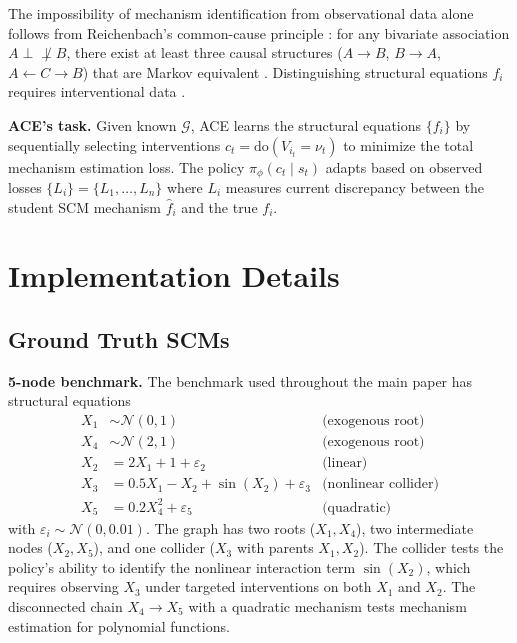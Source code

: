 \documentclass[twoside]{article}
\theoremstyle{plain}
\theoremstyle{definition}
\theoremstyle{remark}
\begin{document}
The impossibility of mechanism identification from observational data alone follows from Reichenbach's common-cause principle \citep{reichenbach1956}: for any bivariate association $A \perp\!\!\!\!\not\perp B$, there exist at least three causal structures ($A \to B$, $B \to A$, $A \leftarrow C \rightarrow B$) that are Markov equivalent \citep{spirtes2000causation,peters2017elements}. Distinguishing structural equations $f_i$ requires interventional data \citep{peters2017elements}.

\textbf{ACE's task.} Given known $\mathcal{G}$, ACE learns the structural equations $\{f_i\}$ by sequentially selecting interventions $c_t = \text{do}(V_{i_t} = \nu_t)$ to minimize the total mechanism estimation loss. The policy $\pi_\phi(c_t \mid s_t)$ adapts based on observed losses $\{L_i\} = \{L_1, \ldots, L_n\}$ where $L_i$ measures current discrepancy between the student SCM mechanism $\hat{f}_i$ and the true $f_i$.

\section{Implementation Details}
\label{app:impl}

\subsection{Ground Truth SCMs}
\label{app:scms}

\textbf{5-node benchmark.} The benchmark used throughout the main paper has structural equations
\begin{align*}
X_1 &\sim \mathcal{N}(0, 1) & \text{(exogenous root)} \\
X_4 &\sim \mathcal{N}(2, 1) & \text{(exogenous root)} \\
X_2 &= 2 X_1 + 1 + \varepsilon_2 & \text{(linear)} \\
X_3 &= 0.5 X_1 - X_2 + \sin(X_2) + \varepsilon_3 & \text{(nonlinear collider)} \\
X_5 &= 0.2 X_4^2 + \varepsilon_5 & \text{(quadratic)}
\end{align*}
with $\varepsilon_i \sim \mathcal{N}(0, 0.01)$. The graph has two roots ($X_1, X_4$), two intermediate nodes ($X_2, X_5$), and one collider ($X_3$ with parents $X_1, X_2$). The collider tests the policy's ability to identify the nonlinear interaction term $\sin(X_2)$, which requires observing $X_3$ under targeted interventions on both $X_1$ and $X_2$. The disconnected chain $X_4 \to X_5$ with a quadratic mechanism tests mechanism estimation for polynomial functions.
\end{document}
